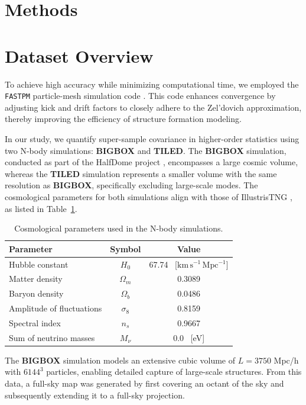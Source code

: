 \section{Methods}\label{sec:methods}
\section{Dataset Overview}
To achieve high accuracy while minimizing computational time, we employed the \texttt{FASTPM} particle-mesh simulation code \citep{10.1093/mnras/stw2123}. This code enhances convergence by adjusting kick and drift factors to closely adhere to the Zel'dovich approximation, thereby improving the efficiency of structure formation modeling.

In our study, we quantify super-sample covariance in higher-order statistics using two N-body simulations: \textbf{BIGBOX} and \textbf{TILED}. The \textbf{BIGBOX} simulation, conducted as part of the HalfDome project \citep{2024arXiv240717462B}, encompasses a large cosmic volume, whereas the \textbf{TILED} simulation represents a smaller volume with the same resolution as \textbf{BIGBOX}, specifically excluding large-scale modes. The cosmological parameters for both simulations align with those of IllustrisTNG \citep{2019ComAC...6....2N}, as listed in Table~\ref{tab:simulations}.

\begin{table}[h]
\centering
\begin{tabular}{lcc}
\toprule
\textbf{Parameter} & \textbf{Symbol} & \textbf{Value} \\
\midrule
Hubble constant & $H_0$ & 67.74 \, [$\mathrm{km\,s^{-1}\,Mpc^{-1}}$] \\ 
Matter density & $\Omega_m$ & 0.3089 \\
Baryon density & $\Omega_b$ & 0.0486 \\
Amplitude of fluctuations & $\sigma_8$ & 0.8159 \\
Spectral index & $n_s$ & 0.9667 \\
Sum of neutrino masses & $M_{\nu}$ & 0.0 \, [eV] \\
\bottomrule
\end{tabular}
\caption{Cosmological parameters used in the N-body simulations.}\label{tab:simulations}
\end{table}

The \textbf{BIGBOX} simulation models an extensive cubic volume of $L = 3750$ Mpc/h with $6144^3$ particles, enabling detailed capture of large-scale structures. From this data, a full-sky map was generated by first covering an octant of the sky and subsequently extending it to a full-sky projection.

